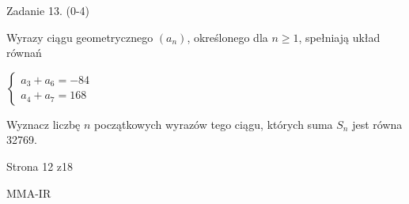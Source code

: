 \documentclass[a4paper,12pt]{article}
\begin{document}
Zadanie 13. (0-4)

Wyrazy ciągu geometrycznego $(a_{n})$, określonego dla $n\geq 1$, spełniają układ równań

$\left\{\begin{array}{l}
a_{3}+a_{6}=-84\\
a_{4}+a_{7}=168
\end{array}\right.$

Wyznacz liczbę $n$ początkowych wyrazów tego ciągu, których suma $S_{n}$ jest równa 32769.

Strona 12 z18

MMA-IR
\end{document}
